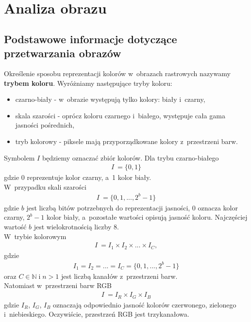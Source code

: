 
\section{Analiza obrazu}
\subsection{Podstawowe informacje dotyczące przetwarzania obrazów}
Określenie sposobu reprezentacji kolorów w~obrazach rastrowych nazywamy \textbf{trybem koloru}. Wyróżniamy następujące tryby koloru:
\begin{itemize}
  \item czarno-biały - w~obrazie występują tylko kolory: biały i~czarny,
  \item skala szarości - oprócz koloru czarnego i~białego, występuje cała gama jasności pośrednich,
  \item tryb kolorowy - piksele mają przyporządkowane kolory z~przestrzeni barw.
\end{itemize}
Symbolem $I$ będziemy oznaczać zbiór kolorów. Dla trybu czarno-białego
\begin{gather*}
 I~= \{0, 1\}
\end{gather*} gdzie 0 reprezentuje kolor czarny, a~1 kolor biały.\\
 W~przypadku skali szarości
\begin{gather*}
 I~= \{0, 1, ..., 2^b-1\}
\end{gather*}
gdzie $b$ jest liczbą bitów potrzebnych do reprezentacji jasności, 0 oznacza kolor czarny, $2^b-1$ kolor biały, a~pozostałe wartości opisują jasność koloru. Najczęściej wartość $b$ jest wielokrotnością liczby 8.\\
 W~trybie kolorowym
\begin{gather*}
 I~= I_1 \times I_2 \times ... \times I_C,
\end{gather*}
gdzie
\begin{gather*}
  I_1 = I_2 = ... = I_C = \{0, 1, ..., 2^b-1\}
\end{gather*}
oraz $C \in \mathbb{N} \; \text{i} \; n > 1$ jest liczbą kanałów z~przestrzeni barw. \\
Natomiast w~przestrzeni barw RGB
\begin{gather*}
 I~= I_R \times I_G \times I_B
\end{gather*}
gdzie $I_R$, $I_G$, $I_B$ oznaczają odpowiednio jasność kolorów czerwonego, zielonego i~niebieskiego. Oczywiście, przestrzeń RGB jest trzykanałowa.
\\
